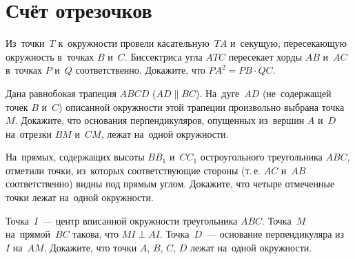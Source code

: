 
\section*{Счёт отрезочков}


\begin{problems}

\item
Из~точки~$T$ к~окружности провели касательную~$TA$ и~секущую, пересекающую
окружность в~точках $B$ и~$C$.
Биссектриса угла $ATC$ пересекает хорды $AB$ и~$AC$ в~точках $P$ и~$Q$
соответственно.
Докажите, что $PA^2 = PB \cdot QC$.

\item
Дана равнобокая трапеция $ABCD$ ($AD \parallel BC$).
На~дуге~$AD$ (не~содержащей точек $B$ и~$C$) описанной окружности этой трапеции
произвольно выбрана точка~$M$.
Докажите, что основания перпендикуляров, опущенных из~вершин $A$ и~$D$
на~отрезки $BM$ и~$CM$, лежат на~одной окружности.

\item
На~прямых, содержащих высоты $B B_1$ и~$C C_1$ остроугольного
треугольника $ABC$, отметили точки, из~которых соответствующие стороны
(т.\,е. $AC$ и~$AB$ соответственно) видны под прямым углом.
Докажите, что четыре отмеченные точки лежат на~одной окружности.


\item
Точка~$I$~--- центр вписанной окружности треугольника $ABC$.
Точка~$M$ на~прямой~$BC$ такова, что $MI \perp AI$.
Точка~$D$~--- основание перпендикуляра из~$I$ на~$AM$.
Докажите, что точки $A$, $B$, $C$, $D$ лежат на~одной окружности.


\end{problems}
